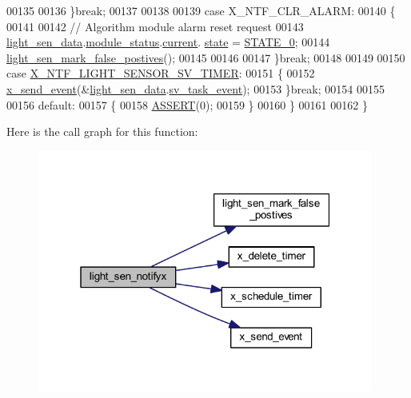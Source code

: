 \begin{DoxyCode}
00135 
00136         \}\textcolor{keywordflow}{break};
00137 
00138 
00139          \textcolor{keywordflow}{case} X\_NTF\_CLR\_ALARM:
00140         \{
00141 
00142            \textcolor{comment}{// Algorithm module alarm reset request}
00143              \hyperlink{a00047_a53c98c9f84d5cecf0747bbe1f6b83696}{light\_sen\_data}.\hyperlink{a00024_a5a53c391562b059eb744ac679f3765ca}{module\_status}.\hyperlink{a00017_ab8af48cdbba92b3ae39c4470e53af944}{current}.
      \hyperlink{a00017_a6b8d8e916bc56265a3fd279bd26b6d1b}{state} = \hyperlink{a00021_ad6739dbbe5581cac99b7dc8a5e09949c}{STATE\_0};
00144              \hyperlink{a00047_acef1622ec5c40fe90bf6184813716e34}{light\_sen\_mark\_false\_postives}();
00145 
00146 
00147         \}\textcolor{keywordflow}{break};
00148 
00149         
00150         \textcolor{keywordflow}{case} \hyperlink{a00024_ad7dfa3ed8d8d926ba462f9e951f1b391}{X\_NTF\_LIGHT\_SENSOR\_SV\_TIMER}:
00151         \{
00152            \hyperlink{a00036_a4bc3d03c8d62c8237329ed4e969fbc1b}{x\_send\_event}(&\hyperlink{a00047_a53c98c9f84d5cecf0747bbe1f6b83696}{light\_sen\_data}.\hyperlink{a00024_a43c345f39ea3aefbb60ef1ef57fe5d83}{sv\_task\_event});
00153         \}\textcolor{keywordflow}{break};
00154         
00155        
00156         \textcolor{keywordflow}{default}:
00157         \{
00158             \hyperlink{a00072_abb8ff8e213ac9f6fb21d2b968583b936}{ASSERT}(0);
00159         \}
00160     \}
00161 
00162 \}
\end{DoxyCode}


Here is the call graph for this function\+:\nopagebreak
\begin{figure}[H]
\begin{center}
\leavevmode
\includegraphics[width=313pt]{d1/d2b/a00018_a317b03892739257278fd51ab8003962d_cgraph}
\end{center}
\end{figure}




